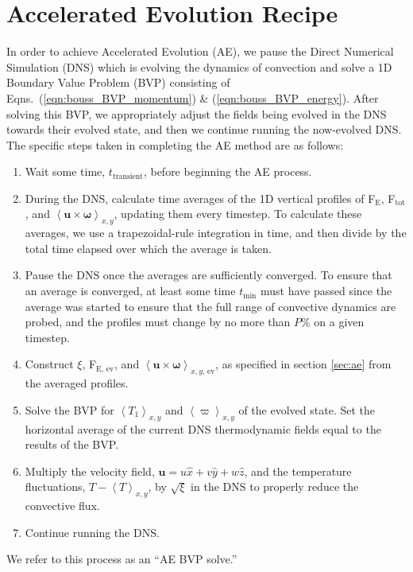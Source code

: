 \documentclass[aps, pre, onecolumn, nofootinbib, notitlepage, groupedaddress, amsfonts, amssymb, amsmath, longbibliography]{revtex4-1}
\newcommand{\angles}[1]{\ensuremath{\left\langle #1 \right\rangle}}
\begin{document}
\section{Accelerated Evolution Recipe}
\label{appendix:recipe}
In order to achieve Accelerated Evolution (AE), we pause the Direct Numerical Simulation (DNS)
which is evolving the dynamics of convection and solve a 1D Boundary Value Problem (BVP)
consisting of Eqns.~(\ref{eqn:bouss_BVP_momentum}) \& (\ref{eqn:bouss_BVP_energy}).
After solving this BVP, we appropriately adjust the fields being evolved in the DNS
towards their evolved state, and then we continue running the now-evolved DNS.
The specific steps taken in completing the AE method are as follows:
\begin{enumerate}
\item Wait some time, $t_{\text{transient}}$, before beginning the AE process.
\item During the DNS, calculate time averages of the 1D vertical profiles of
F$_{\text{E}}$, F$_{\text{tot}}$, 
and $\angles{\bm{u} \times \bm{\omega}}_{x,y}$, updating them every timestep.  
To calculate these
averages, we use a trapezoidal-rule integration in time, and then divide by the
total time elapsed over which the average is taken. 
\item Pause the DNS once the averages are sufficiently converged. 
To ensure that an average is converged, at
least some time $t_{\text{min}}$ must have passed since the average was started to
ensure that the full range of convective dynamics are probed, and
the profiles must change by no more than $P$\% on a given timestep.
\item Construct $\xi$, F$_{\text{E, ev}}$, and $\angles{\bm{u} \times \bm{\omega}}_{x,y\text{, ev}}$,
as specified in section \ref{sec:ae}
from the averaged profiles.
\item Solve the BVP for $\angles{T_1}_{x,y}$ and $\angles{\varpi}_{x,y}$ of the
evolved state.  Set the horizontal average of the current DNS thermodynamic fields
equal to the results of the BVP.
\item Multiply the velocity field, $\bm{u} = u\hat{x} + v\hat{y} + w\hat{z}$,
and the temperature fluctuations, $T - \angles{T}_{x,y}$,
by $\sqrt{\xi}$ in the DNS to properly reduce the convective flux.
\item Continue running the DNS.
\end{enumerate}
We refer to this process as an ``AE BVP solve.''
\end{document}
